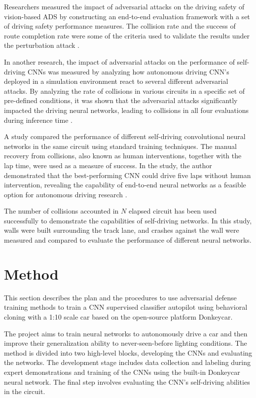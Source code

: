 \documentclass[12pt]{article}
\begin{document}
Researchers measured the impact of adversarial attacks on the driving safety of vision-based ADS by constructing an end-to-end evaluation framework with a set of driving safety performance measures. The collision rate and the success of route completion rate were some of the criteria used to validate the results under the perturbation attack \parencite{zhang}.

In another research, the impact of adversarial attacks on the performance of self-driving CNNs was measured by analyzing how autonomous driving CNN's deployed in a simulation environment react to several different adversarial attacks. By analyzing the rate of collisions in various circuits in a specific set of pre-defined conditions, it was shown that the adversarial attacks significantly impacted the driving neural networks, leading to collisions in all four evaluations during inference time \parencite{piazzesi}.

A study compared the performance of different self-driving convolutional neural networks in the same circuit using standard training techniques. The manual recovery from collisions, also known as human interventions, together with the lap time, were used as a measure of success. In the study, the author demonstrated that the best-performing CNN could drive five laps without human intervention, revealing the capability of end-to-end neural networks as a feasible option for autonomous driving research \parencite{liivak}.

The number of collisions accounted in \(N\) elapsed circuit has been used successfully to demonstrate the capabilities of self-driving networks. In this study, walls were built surrounding the track lane, and crashes against the wall were measured and compared to evaluate the performance of different neural networks. 

\newpage
\section{Method}

This section describes the plan and the procedures to use adversarial defense training methods to train a CNN supervised classifier autopilot using behavioral cloning with a 1:10 scale car based on the open-source platform Donkeycar.

The project aims to train neural networks to autonomously drive a car and then improve their generalization ability to never-seen-before lighting conditions. The method is divided into two high-level blocks, developing the CNNs and evaluating the networks. The development stage includes data collection and labeling during expert demonstrations and training of the CNNs using the built-in Donkeycar neural network. The final step involves evaluating the CNN's self-driving abilities in the circuit.
\end{document}
